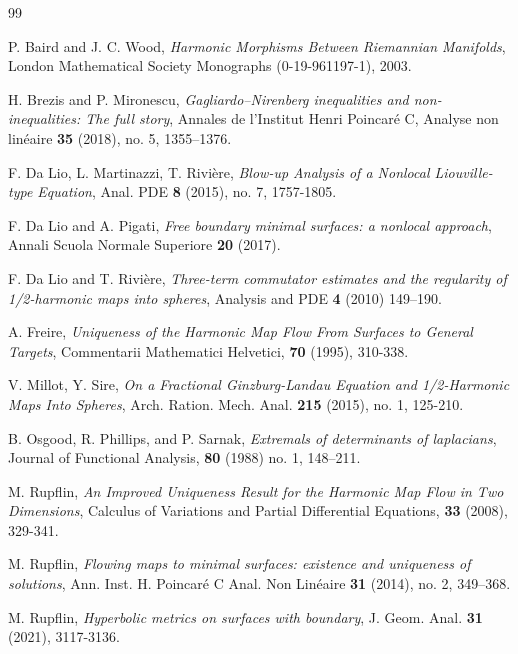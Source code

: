 \documentclass[10pt,reqno]{amsart}
\theoremstyle{plain}
\theoremstyle{definition}
\numberwithin{equation}{section}
\begin{document}
\begin{thebibliography}{99}

 P. Baird and J. C. Wood, \emph{Harmonic Morphisms Between Riemannian Manifolds}, London Mathematical Society Monographs (0-19-961197-1), 2003.

 H. Brezis and P. Mironescu, \emph{Gagliardo–Nirenberg inequalities and non-inequalities: The full story}, Annales de l'Institut Henri Poincaré C, Analyse non linéaire \textbf{35} (2018), no. 5, 1355--1376.

 F. Da Lio, L. Martinazzi, T. Rivi\`ere, \emph{Blow-up Analysis of a Nonlocal Liouville-type Equation}, Anal. PDE \textbf{8} (2015), no. 7, 1757-1805.

 F. Da Lio and A. Pigati, \emph{Free boundary minimal surfaces: a nonlocal approach}, Annali Scuola Normale Superiore {\bf 20} (2017).

 F. Da Lio and T. Rivi\`ere, \textit{Three-term commutator estimates and the regularity of 1/2-harmonic maps into spheres}, Analysis and PDE \textbf{4} (2010) 149--190. 

 A. Freire, \emph{ Uniqueness of the Harmonic Map Flow From Surfaces to General Targets}, Commentarii Mathematici Helvetici, \textbf{70} (1995), 310-338. 


 V. Millot, Y. Sire, \emph{On a Fractional Ginzburg-Landau Equation and 1/2-Harmonic Maps Into Spheres}, Arch. Ration. Mech. Anal. \textbf{215} (2015), no. 1, 125-210.

 B. Osgood, R. Phillips, and P. Sarnak, 
\emph{Extremals of determinants of laplacians}, Journal of Functional Analysis, \textbf{80} (1988) no. 1, 148–211.

 M. Rupflin, \emph{An Improved Uniqueness Result for the Harmonic Map Flow in Two Dimensions}, Calculus of Variations and Partial Differential Equations, \textbf{33} (2008), 329-341.


 M. Rupflin, \emph{Flowing maps to minimal surfaces: existence and uniqueness of solutions}, Ann. Inst. H. Poincaré C Anal. Non Linéaire \textbf{31} (2014), no. 2, 349--368. 

 M. Rupflin, \emph{Hyperbolic metrics on surfaces with boundary}, J. Geom. Anal. \textbf{31} (2021), 3117-3136. 


\end{thebibliography}
\end{document}
